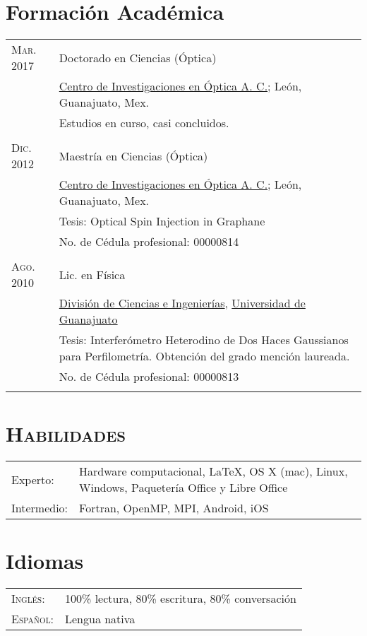 \documentclass[letterpaper,10pt]{article}
\begin{document}
\newpage
\section{Formaci\'on Acad\'emica}
\begin{tabular}{R{4cm}|p{11cm}}
\textsc{Mar. 2017 }	&	Doctorado en Ciencias (\'Optica) \\
						&	\href{http://www.cio.mx/}{Centro de Investigaciones en \'Optica A. C.}; Le\'on, Guanajuato, Mex.\\
						&	Estudios en curso, casi concluidos.\\
					 \\

\textsc{Dic. 2012 }	&	Maestr\'ia en Ciencias (\'Optica) \\
						&	\href{http://www.cio.mx/}{Centro de Investigaciones en \'Optica A. C.}; Le\'on, Guanajuato, Mex.\\
						&	Tesis: Optical Spin Injection in Graphane\\
						&	No. de C\'edula profesional: 00000814\\
					 \\

\textsc{Ago. 2010 }	&	Lic. en F\'isica \\
						&	\href{https://fisica.ugto.mx}{Divisi\'on de Ciencias e Ingenier\'ias}, \href{http://www.ugto.mx}{Universidad de Guanajuato}\\
						&	Tesis: Interfer\'ometro Heterodino de Dos Haces Gaussianos para Perfilometr\'ia. Obtenci\'on del grado menci\'on laureada.\\
						&	No. de C\'edula profesional: 00000813\\
					 \\
\end{tabular}

\section{\textsc{Habilidades}}
	\begin{tabular}{R{4cm} p{10cm}}
		Experto:	&	Hardware computacional, \LaTeX, OS X (mac), Linux, Windows, Paqueter\'ia Office y Libre Office\\ 
		Intermedio:	&	Fortran, OpenMP, MPI, Android, iOS\\
	\end{tabular}

\section{Idiomas}
	\begin{tabular}{R{4cm}l}
		\textsc{Ingl\'es}:	&	100\% lectura, 80\% escritura, 80\% conversaci\'on \\
		\textsc{Espa\~nol}:	&	Lengua nativa \\
	\end{tabular}
\end{document}

